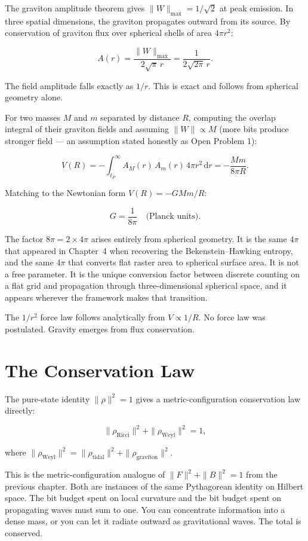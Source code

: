 The graviton amplitude theorem gives $\|W\|_{\max} = 1/\sqrt{2}$ at
peak emission. In three spatial dimensions, the graviton propagates
outward from its source. By conservation of graviton flux over
spherical shells of area $4\pi r^2$:

\[
A(r) = \frac{\|W\|_{\max}}{2\sqrt{\pi}\,r} = \frac{1}{2\sqrt{2\pi}\,r}.
\]

The field amplitude falls exactly as $1/r$. This is exact and follows
from spherical geometry alone.

For two masses $M$ and $m$ separated by distance $R$, computing the
overlap integral of their graviton fields and assuming $\|W\| \propto M$
(more bits produce stronger field --- an assumption stated honestly as
Open Problem 1):

\[
V(R) = -\int_{\ell_P}^{\infty} A_M(r)\,A_m(r)\,4\pi r^2\,\mathrm{d}r
= -\frac{Mm}{8\pi R}.
\]

Matching to the Newtonian form $V(R) = -GMm/R$:

\[
\boxed{G = \frac{1}{8\pi} \quad \text{(Planck units).}}
\]

The factor $8\pi = 2 \times 4\pi$ arises entirely from spherical
geometry. It is the same $4\pi$ that appeared in Chapter~4 when
recovering the Bekenstein--Hawking entropy, and the same $4\pi$ that
converts flat raster area to spherical surface area. It is not a free
parameter. It is the unique conversion factor between discrete counting
on a flat grid and propagation through three-dimensional spherical
space, and it appears wherever the framework makes that transition.

The $1/r^2$ force law follows analytically from $V \propto 1/R$.
No force law was postulated. Gravity emerges from flux conservation.

\section{The Conservation Law}

The pure-state identity $\|\rho\|^2 = 1$ gives a metric-configuration
conservation law directly:

\[
\|\rho_{\mathrm{Ricci}}\|^2 + \|\rho_{\mathrm{Weyl}}\|^2 = 1,
\]

where $\|\rho_{\mathrm{Weyl}}\|^2 = \|\rho_{\mathrm{tidal}}\|^2 +
\|\rho_{\mathrm{graviton}}\|^2$.

This is the metric-configuration analogue of $\|F\|^2 + \|B\|^2 = 1$
from the previous chapter. Both are instances of the same Pythagorean
identity on Hilbert space. The bit budget spent on local curvature and
the bit budget spent on propagating waves must sum to one. You can
concentrate information into a dense mass, or you can let it radiate
outward as gravitational waves. The total is conserved.

